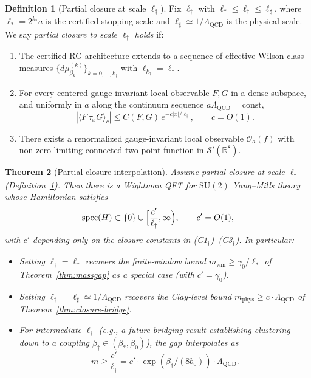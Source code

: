 \documentclass[11pt]{article}
\newtheorem{theorem}{Theorem}[section]
\theoremstyle{definition}
\newtheorem{definition}[theorem]{Definition}
\newcommand{\SU}{\mathrm{SU}}
\newcommand{\R}{\mathbb{R}}
\newcommand{\Lam}{\Lambda_{\mathrm{QCD}}}
\begin{document}
\begin{definition}[Partial closure at scale $\ell_\dagger$]
\label{def:partial-closure}
Fix $\ell_\dagger$ with $\ell_*\le \ell_\dagger\le \ell_\sharp$,
where $\ell_*=2^{k_*}a$ is the certified stopping scale and
$\ell_\sharp\simeq 1/\Lam$ is the physical scale.  We say
\emph{partial closure to scale $\ell_\dagger$ holds} if:
\begin{enumerate}[label=\textup{(C1$_\dagger$)},leftmargin=2.5em,nosep]
\item[\textup{(C1$_\dagger$)}] The certified RG architecture extends
to a sequence of effective Wilson-class measures
$\{d\mu^{(k)}_{\beta_k}\}_{k=0,\ldots,k_\dagger}$ with
$\ell_{k_\dagger}=\ell_\dagger$.
\item[\textup{(C2$_\dagger$)}] For every centered gauge-invariant
local observable $F,G$ in a dense subspace, and uniformly in $a$
along the continuum sequence $a\Lam=\mathrm{const}$,
\[
|\langle F\,\tau_x G\rangle_c|
\le C(F,G)\,e^{-c|x|/\ell_\dagger},
\qquad c=O(1).
\]
\item[\textup{(C3$_\dagger$)}] There exists a renormalized
gauge-invariant local observable $\mathcal O_a(f)$ with non-zero
limiting connected two-point function in $\mathcal S'(\R^8)$.
\end{enumerate}
\end{definition}

\begin{theorem}[Partial-closure interpolation]\label{thm:interp}
Assume partial closure at scale $\ell_\dagger$
\textup{(}Definition~\ref{def:partial-closure}\textup{)}.  Then there
is a Wightman QFT for $\SU(2)$ Yang--Mills theory whose Hamiltonian
satisfies
\begin{equation}\label{eq:interp-gap}
\operatorname{spec}(H)\subset\{0\}\cup
\Bigl[\frac{c'}{\ell_\dagger},\infty\Bigr),
\qquad c'=O(1),
\end{equation}
with $c'$ depending only on the closure constants in
\textup{(C1$_\dagger$)}--\textup{(C3$_\dagger$)}.  In particular:
\begin{itemize}[nosep]
\item Setting $\ell_\dagger=\ell_*$ recovers the finite-window bound
$m_{\mathrm{win}}\ge\gamma_0/\ell_*$ of
Theorem~\ref{thm:massgap} as a special case
\textup{(}with $c'=\gamma_0$\textup{)}.
\item Setting $\ell_\dagger=\ell_\sharp\simeq 1/\Lam$ recovers the
Clay-level bound
$m_{\mathrm{phys}}\ge c\cdot \Lam$ of
Theorem~\ref{thm:closure-bridge}.
\item For intermediate $\ell_\dagger$ \textup{(}e.g., a future bridging
result establishing clustering down to a coupling
$\beta_\dagger\in(\beta_*,\beta_0)$\textup{)}, the gap interpolates as
\[
m\ge\frac{c'}{\ell_\dagger}=c'\cdot\exp(\beta_\dagger/(8b_0))\cdot \Lam.
\]
\end{itemize}
\end{theorem}
\end{document}
